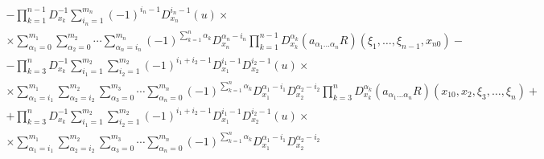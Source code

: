 \begin{multline}
% 


-\prod^{n-1}_{k=1} D^{-1}_{x_k} 


\sum^{m_n}_{i_n=1}(-1)^{i_n-1}D^{i_n-1}_{x_n}(u)\times \\ 


%


\times \sum^{m_1}_{\alpha_1=0}\sum^{m_2}_{\alpha_2=0} 


\dotsb\sum^{m_n}_{\alpha_n=i_n} 


(-1)^{\sum\limits^n_{k=1}\alpha_k}D^{\alpha_n-i_n}_{x_n} 


\prod^{n-1}_{k=1}D^{\alpha_k}_{x_k}(a_{\alpha_1\dotsc\alpha_n}R) 


(\xi_1,\dotsc,\xi_{n-1},x_{n0})- \\ 


%


-\prod^{n}_{k=3} D^{-1}_{x_k}


\sum^{m_2}_{i_1=1} 


\sum^{m_2}_{i_2=1}(-1)^{i_1+i_2-1}D^{i_1-1}_{x_1} 


D^{i_2-1}_{x_2}(u)\times \\ 


% 


\times \sum^{m_1}_{\alpha_1=i_1}\sum^{m_2}_{\alpha_2=i_2} 


\sum^{m_3}_{\alpha_3=0}\dotsb\sum^{m_n}_{\alpha_n=0} 


(-1)^{\sum\limits^n_{k=1}\alpha_k}D^{\alpha_1-i_1}_{x_1} 


D^{\alpha_2-i_2}_{x_2} 


\prod^{n}_{k=3}D^{\alpha_k}_{x_k}(a_{\alpha_1\dotsc\alpha_n}R) 


(x_{10},x_2,\xi_3,\dotsc,\xi_{n})+ \\ 


% 


+\prod^{n}_{k=3} D^{-1}_{x_k}


\sum^{m_2}_{i_1=1} 


\sum^{m_2}_{i_2=1}(-1)^{i_1+i_2-1}D^{i_1-1}_{x_1} 


D^{i_2-1}_{x_2}(u)\times \\


% 


\times \sum^{m_1}_{\alpha_1=i_1}\sum^{m_2}_{\alpha_2=i_2} 


\sum^{m_3}_{\alpha_3=0}\dotsb\sum^{m_n}_{\alpha_n=0} 


(-1)^{\sum\limits^n_{k=1}\alpha_k}D^{\alpha_1-i_1}_{x_1} 


D^{\alpha_2-i_2}_{x_2} 



\end{multline}
